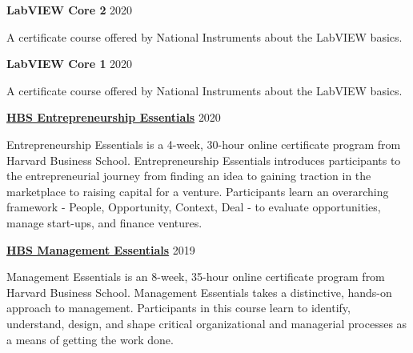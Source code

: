 \documentclass[margin,line]{res}
\begin{document}
\begin{resume}
\vspace*{-2mm}

{\bf LabVIEW Core 2} \hfill {2020}\\
\vspace*{-3.5mm}
\begin{addmargin}[0pt]{.1\linewidth}
\vspace*{-1mm}
A certificate course offered by National Instruments about the LabVIEW basics.
\end{addmargin}

\vspace*{-2mm}

{\bf LabVIEW Core 1} \hfill {2020}\\
\vspace*{-3.5mm}
\begin{addmargin}[0pt]{.1\linewidth}
\vspace*{-1mm}
A certificate course offered by National Instruments about the LabVIEW basics.
\end{addmargin}

\vspace*{-2mm}

{\bf \href{https://online.hbs.edu/courses/entrepreneurship-essentials/}{HBS Entrepreneurship Essentials}} \hfill {2020}\\
\vspace*{-3.5mm}
\begin{addmargin}[0pt]{.1\linewidth}
\vspace*{-1mm}
Entrepreneurship Essentials is a 4-week, 30-hour online certificate program from Harvard Business School. Entrepreneurship Essentials introduces participants to the entrepreneurial journey from finding an idea to gaining traction in the marketplace to raising capital for a venture. Participants learn an overarching framework - People, Opportunity, Context, Deal - to evaluate opportunities, manage start-ups, and finance ventures.
\end{addmargin}

\vspace*{-2mm}

{\bf \href{https://online.hbs.edu/courses/management-essentials/}{HBS Management Essentials}} \hfill {2019}\\
\vspace*{-3.5mm}
\begin{addmargin}[0pt]{.1\linewidth}
\vspace*{-1mm}
Management Essentials is an 8-week, 35-hour online certificate program from Harvard Business School. Management Essentials takes a distinctive, hands-on approach to management. Participants in this course learn to identify, understand, design, and shape critical organizational and managerial processes as a means of getting the work done.
\end{addmargin}


\end{resume}
\end{document}
